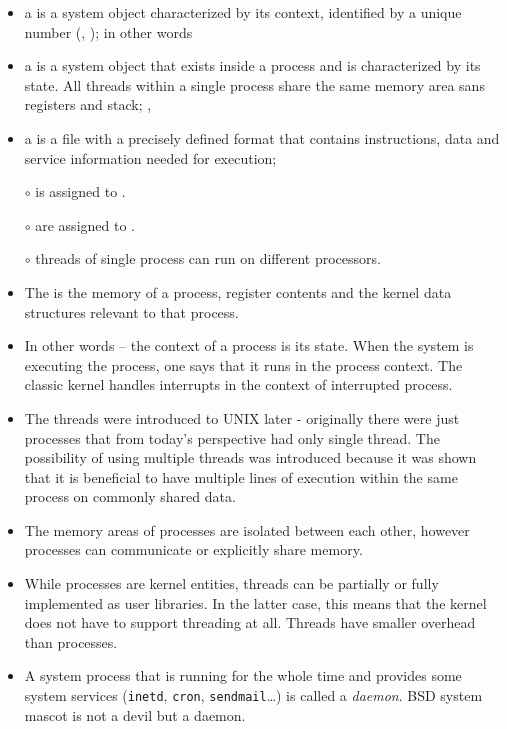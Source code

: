 \begin{slide}
\begin{itemize}
\item a  is a system object characterized by its context,
identified by a unique number (,
); in other words  
\item a  is a system object that exists inside a process and
is characterized by its state. All threads within a single process share
the same memory area sans registers and stack; ,
\item a  is a file with a precisely defined format that contains
instructions, data and service information needed for execution;
\end{itemize}

\begin{itemize}
\item[$\circ$]  is assigned to . 
\item[$\circ$]  are assigned to .
\item[$\circ$] threads of single process can run on different processors.
\end{itemize}
\end{slide}

\begin{itemize}
\item The  is the memory of a process, register contents and
the kernel data structures relevant to that process.
\item In other words -- the context of a process is its state. When the system
is executing the process, one says that it runs in the process context.
The classic kernel handles interrupts in the context of interrupted process.
\item The threads were introduced to UNIX later - originally there were just
processes that from today's perspective had only single thread. The possibility
of using multiple threads was introduced because it was shown that it is
beneficial to have multiple lines of execution within the same process on
commonly shared data.
\item The memory areas of processes are isolated between each other, however
processes can communicate or explicitly share memory.
\item While processes are kernel entities, threads can be partially or fully
implemented as user libraries. In the latter case, this means that the kernel
does not have to support threading at all. Threads have smaller overhead than
processes.
\item A system process that is running for the whole time and provides some
system services (\texttt{inetd}, \texttt{cron}, \texttt{sendmail}\dots) is
called a \emph{daemon}. BSD system mascot is not a devil but a daemon.
\end{itemize}

